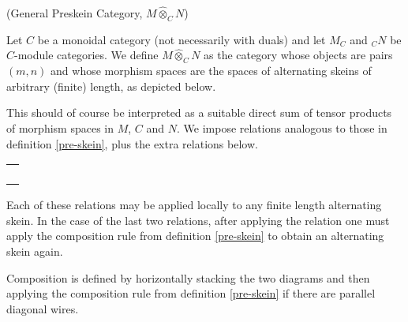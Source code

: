 \begin{definition} \label{pre-skein_no-duals} (General Preskein Category, $M \hat{\otimes}_C N$)

  \noindent Let $C$ be a monoidal category (not necessarily with duals) and let $M_C$ and $_{C}N$ be
  $C$-module categories. We define $M \hat{\otimes}_C N$ as the category whose
  objects are pairs $(m,n)$ and whose morphism spaces are the spaces of
  alternating skeins of arbitrary (finite) length, as depicted below.

  \begin{center}
    
  \end{center}

  This should of course be interpreted as a suitable direct sum of tensor
  products of morphism spaces in $M$, $C$ and $N$. We impose relations
  analogous to those in definition \ref{pre-skein}, plus the extra relations
  below.

  \begin{center}
    \begin{tabular}{l}
       \\
       \\
       \\
       \\
       \\
      
    \end{tabular}
  \end{center}

  Each of these relations may be applied locally to any finite length
  alternating skein. In the case of the last two relations, after applying the
  relation one must apply the composition rule from definition \ref{pre-skein}
  to obtain an alternating skein again.

  Composition is defined by horizontally stacking the two diagrams and then
  applying the composition rule from definition \ref{pre-skein} if there are
  parallel diagonal wires.
\end{definition}

